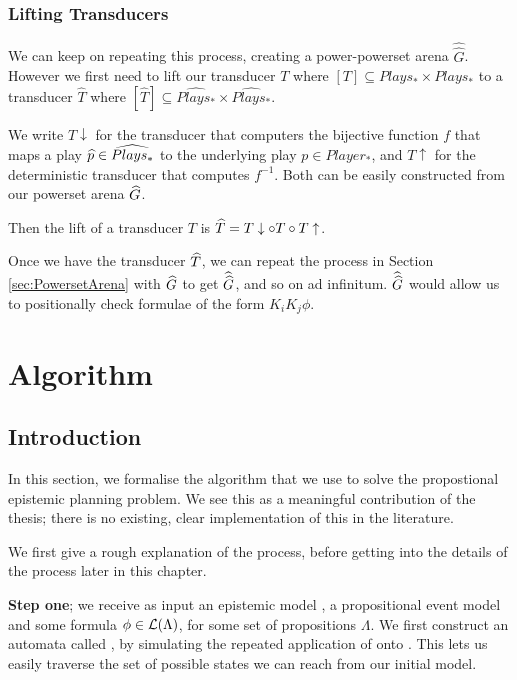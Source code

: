 \documentclass[12pt, a4paper]{article}
\begin{document}
\subsubsection{Lifting Transducers}

We can keep on repeating this process, creating a power-powerset arena
$\widehat{\widehat{G}}$. However we first need to lift our transducer $T$ where
$[T] \subseteq Plays_\ast \times Plays_\ast$ to a transducer $\widehat{T}$ where
$[\widehat{T}] \subseteq \widehat{Plays_\ast} \times \widehat{Plays_\ast}$.

We write $T\downarrow$ for the transducer that computers the bijective function
$f$ that maps a play $\widehat{p} \in \widehat{Plays_\ast}$ to the underlying play $p
\in Player_\ast$, and $T\uparrow$ for the deterministic transducer that computes
$f^{-1}$. Both can be easily constructed from our powerset arena $\widehat{G}$.

Then the lift of a transducer $T$ is $\widehat{T} = T\downarrow \circ T \circ
T\uparrow$.

Once we have the transducer $\widehat{T}$, we can repeat the process in Section
\ref{sec:PowersetArena} with $\widehat{G}$ to get $\widehat{\widehat{G}}$, and so on ad
infinitum. $\widehat{\widehat{G}}$ would allow us to positionally check formulae of the
form $K_i K_j \phi$.

\newpage

\section{Algorithm}

\subsection{Introduction}

In this section, we formalise the algorithm that we use to solve the
propostional epistemic planning problem. We see this as a meaningful
contribution of the thesis; there is no existing, clear implementation of this
in the literature.

We first give a rough explanation of the process, before getting into the
details of the process later in this chapter.

\bigskip

\textbf{Step one}; we receive as input an epistemic model , a
propositional event model  and some formula $\phi \in \mathcal{L}(\Lambda)$,
for some set of propositions $\Lambda$. We first construct an automata called
\mestar, by simulating the repeated application of  onto . This
lets us easily traverse the set of possible states we can reach from our initial
model.
\end{document}
